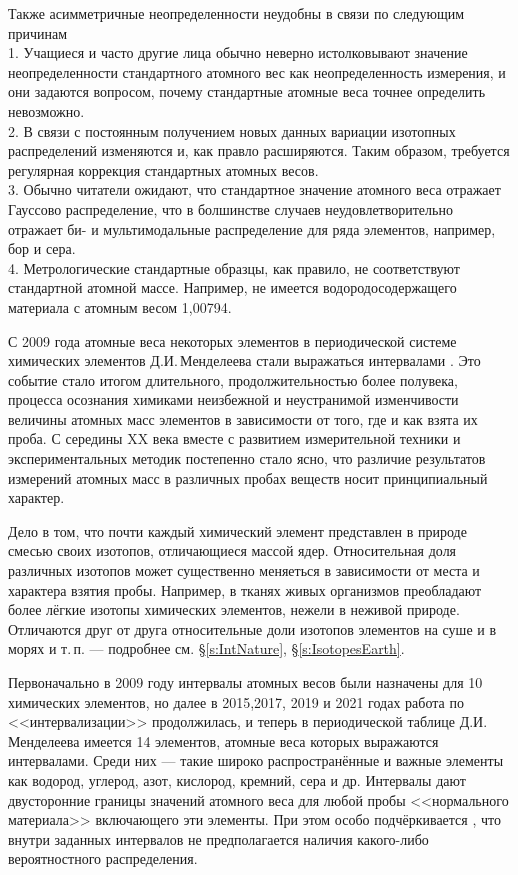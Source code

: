 \documentclass[a5paper,openany]{book}
\begin{document}
Также асимметричные неопределенности неудобны в связи по следующим причинам\\
1. Учащиеся и часто другие лица обычно неверно истолковывают значение неопределенности стандартного атомного вес как неопределенность измерения, и они задаются вопросом, почему стандартные атомные веса
точнее определить невозможно.\\
2. В связи с постоянным получением новых данных вариации изотопных распределений изменяются и, как правло расширяются. Таким образом, требуется регулярная коррекция стандартных атомных весов.\\
3. Обычно читатели ожидают, что стандартное значение атомного веса отражает
Гауссово распределение, что в болшинстве случаев неудовлетворительно отражает би- и мультимодальные распределение для ряда элементов, например, бор и сера.\\
4. Метрологические стандартные образцы, как правило, не соответствуют стандартной атомной массе. Например, не имеется водородосодержащего материала с атомным весом 1,00794.



С 2009 года атомные веса некоторых элементов в периодической системе химических 
элементов Д.И.\,Менделеева стали выражаться интервалами \cite{IUPAC}. Это событие 
стало итогом длительного, продолжительностью более полувека, процесса осознания 
химиками неизбежной и неустранимой изменчивости величины атомных масс элементов 
в зависимости от того, где и как взята их проба. С середины XX века вместе 
с развитием измерительной техники и экспериментальных методик постепенно стало ясно, 
что различие результатов измерений атомных масс в различных пробах веществ носит 
принципиальный характер. 

Дело в том, что почти каждый химический элемент представлен в природе смесью своих 
изотопов, отличающиеся массой ядер. Относительная 
доля различных изотопов может существенно меняеться в зависимости от места и характера 
взятия пробы. Например, в тканях живых организмов преобладают более лёгкие изотопы 
химических элементов, нежели в неживой природе. Отличаются друг от друга 
относительные доли изотопов элементов на суше и в морях и т.\,п. --- подробнее см. \S\ref{s:IntNature}, \S\ref{s:IsotopesEarth}.


Первоначально в 2009 году интервалы атомных весов были назначены для 10 химических 
элементов, но далее в 2015,2017, 2019 и 2021 годах работа по <<интервализации>> продолжилась, 
и теперь в периодической таблице Д.И.\,Менделеева имеется 14 элементов, атомные веса 
которых выражаются интервалами. Среди них --- такие широко распространённые и важные 
элементы как водород, углерод, азот, кислород, кремний, сера и др. Интервалы дают 
двусторонние границы значений атомного веса для любой пробы <<нормального материала>>
включающего эти элементы. При этом особо подчёркивается \cite{IUPAC}, что внутри 
заданных интервалов не предполагается наличия какого-либо вероятностного распределения. 
\end{document}
